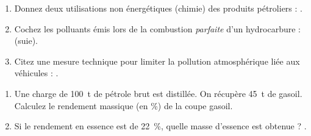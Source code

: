 \documentclass[11pt]{article}
\begin{document}
\begin{exercice}
\begin{enumerate}
    \item Donnez deux utilisations non énergétiques (chimie) des produits pétroliers : \underline{\hspace{6cm}}.
    \item Cochez les polluants émis lors de la combustion \textit{parfaite} d'un hydrocarbure : \quad {} \quad {} \quad {} \quad {} \quad {} \quad {} (suie).
    \item Citez une mesure technique pour limiter la pollution atmosphérique liée aux véhicules : \underline{\hspace{6cm}}.
\end{enumerate}
\end{exercice}

\begin{exercice}
\begin{enumerate}
    \item Une charge de \SI{100}{\tonne} de pétrole brut est distillée. On récupère \SI{45}{\tonne} de gasoil. Calculez le rendement massique (en \%) de la coupe gasoil.
    \item Si le rendement en essence est de \SI{22}{\%}, quelle masse d'essence est obtenue ? \quad \underline{\hspace{4cm}}.
\end{enumerate}
\end{exercice}
\end{document}
